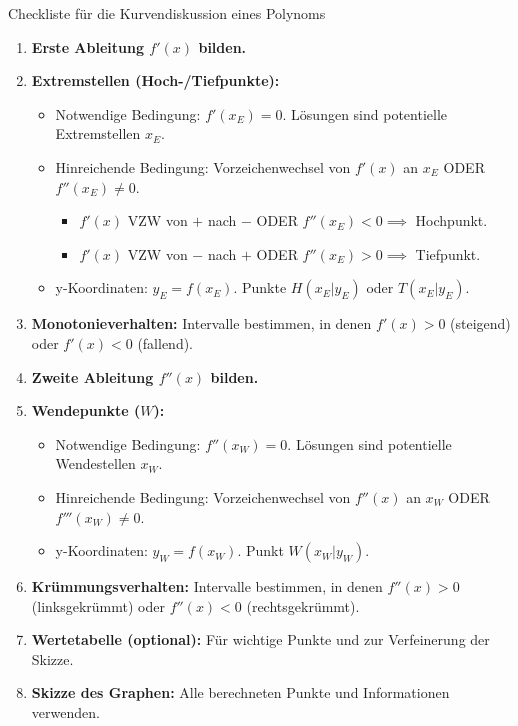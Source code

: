 \begin{merksatzumgebung}{Checkliste für die Kurvendiskussion eines Polynoms}
\begin{enumerate}
\begin{itemize}
\begin{itemize}
                \end{itemize}
        \end{itemize}
    \item \textbf{Erste Ableitung $f'(x)$ bilden.}
    \item \textbf{Extremstellen (Hoch-/Tiefpunkte):}
        \begin{itemize}
            \item Notwendige Bedingung: $f'(x_E)=0$. Lösungen sind potentielle Extremstellen $x_E$.
            \item Hinreichende Bedingung: Vorzeichenwechsel von $f'(x)$ an $x_E$ ODER $f''(x_E) \neq 0$.
                \begin{itemize}
                    \item $f'(x)$ VZW von $+$ nach $-$ ODER $f''(x_E) < 0 \implies$ Hochpunkt.
                    \item $f'(x)$ VZW von $-$ nach $+$ ODER $f''(x_E) > 0 \implies$ Tiefpunkt.
                \end{itemize}
            \item y-Koordinaten: $y_E = f(x_E)$. Punkte $H(x_E|y_E)$ oder $T(x_E|y_E)$.
        \end{itemize}
    \item \textbf{Monotonieverhalten:} Intervalle bestimmen, in denen $f'(x)>0$ (steigend) oder $f'(x)<0$ (fallend).
    \item \textbf{Zweite Ableitung $f''(x)$ bilden.}
    \item \textbf{Wendepunkte ($W$):}
        \begin{itemize}
            \item Notwendige Bedingung: $f''(x_W)=0$. Lösungen sind potentielle Wendestellen $x_W$.
            \item Hinreichende Bedingung: Vorzeichenwechsel von $f''(x)$ an $x_W$ ODER $f'''(x_W) \neq 0$.
            \item y-Koordinaten: $y_W = f(x_W)$. Punkt $W(x_W|y_W)$.
        \end{itemize}
    \item \textbf{Krümmungsverhalten:} Intervalle bestimmen, in denen $f''(x)>0$ (linksgekrümmt) oder $f''(x)<0$ (rechtsgekrümmt).
    \item \textbf{Wertetabelle (optional):} Für wichtige Punkte und zur Verfeinerung der Skizze.
    \item \textbf{Skizze des Graphen:} Alle berechneten Punkte und Informationen verwenden.
\end{enumerate}
\end{merksatzumgebung}

